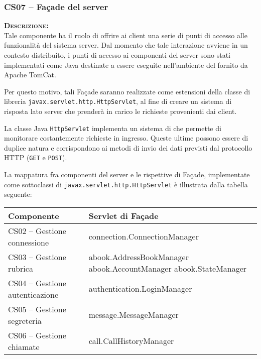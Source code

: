 \subsubsection{CS07 -- Façade del server}\label{sec:serverfacade}
\begin{description}
	\item{\scshape\bfseries Descrizione:}\\
Tale componente ha il ruolo di offrire ai client una serie di punti di accesso alle funzionalità del sistema server. Dal momento che tale interazione avviene in un contesto distribuito, i punti di accesso ai componenti del server sono stati implementati come  Java destinate a essere eseguite nell'ambiente del  fornito da Apache TomCat.

Per questo motivo, tali Façade saranno realizzate come estensioni della classe di libreria \texttt{javax.servlet.http.HttpServlet}, al fine di creare un sistema di risposta lato server che prenderà in carico le richieste provenienti dai client.

La classe Java \texttt{HttpServlet} implementa un sistema di  che permette di monitorare costantemente richieste in ingresso. Queste ultime possono essere di duplice natura e corrispondono ai metodi di invio dei dati previsti dal protocollo HTTP (\texttt{GET} e \texttt{POST}).

La mappatura fra componenti del server e le rispettive  di Façade, implementate come sottoclassi di \texttt{javax.servlet.http.HttpServlet} è illustrata dalla tabella seguente:
\begin{center}
\begin{tabular}{>{\sffamily}l>{\ttfamily}p{}}
\toprule
\textbf{\rmfamily Componente} & \textbf{\rmfamily Servlet di Façade}\\
\midrule
CS02 -- Gestione connessione & connection.ConnectionManager\\
CS03 -- Gestione rubrica & abook.AddressBookManager abook.AccountManager abook.StateManager\\
CS04 -- Gestione autenticazione & authentication.LoginManager\\
CS05 -- Gestione segreteria & message.MessageManager\\
CS06 -- Gestione chiamate & call.CallHistoryManager\\
\bottomrule
\end{tabular}
\end{center}


\end{description}
